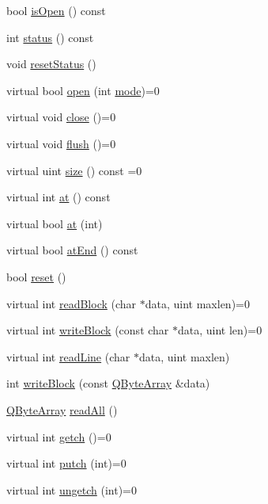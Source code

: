 \begin{DoxyCompactItemize}
\item 
bool \hyperlink{class_q_i_o_device_a3c7351cec1380d07f9e4b3ec96b2b1ff}{is\-Open} () const 
\item 
int \hyperlink{class_q_i_o_device_a8bcf950a774cbd3106d4c68d3b2f38c9}{status} () const 
\item 
void \hyperlink{class_q_i_o_device_ab1ada06d6d8928f3d31426739e477b19}{reset\-Status} ()
\item 
virtual bool \hyperlink{class_q_i_o_device_ab12465ab61dfc4e6de94a9b039d00759}{open} (int \hyperlink{class_q_i_o_device_a649d73845b061693fc34041ba743191c}{mode})=0
\item 
virtual void \hyperlink{class_q_i_o_device_a99e62b97d3c24562d2dd84c47fab6b06}{close} ()=0
\item 
virtual void \hyperlink{class_q_i_o_device_a4d70e7cca08ae728d486c63f4804e63b}{flush} ()=0
\item 
virtual uint \hyperlink{class_q_i_o_device_add26671f6640db9316df9922fef40b38}{size} () const =0
\item 
virtual int \hyperlink{class_q_i_o_device_a3bce8d0bb4d6fbaa012b9a61c3910907}{at} () const 
\item 
virtual bool \hyperlink{class_q_i_o_device_afbf6dc03efea5d2f5098b8316a8a66b9}{at} (int)
\item 
virtual bool \hyperlink{class_q_i_o_device_a11cbf4ba82ee565cb9eef28b972bf145}{at\-End} () const 
\item 
bool \hyperlink{class_q_i_o_device_a50910ef42a65d4c139af341f1ef2323f}{reset} ()
\item 
virtual int \hyperlink{class_q_i_o_device_ac0c97a10369456c0942192a14f11c188}{read\-Block} (char $\ast$data, uint maxlen)=0
\item 
virtual int \hyperlink{class_q_i_o_device_a90a5a6111eca9a444970cf49aea9f9a8}{write\-Block} (const char $\ast$data, uint len)=0
\item 
virtual int \hyperlink{class_q_i_o_device_aa360b2281966b05ff25504cf03046c90}{read\-Line} (char $\ast$data, uint maxlen)
\item 
int \hyperlink{class_q_i_o_device_ac2c00524f1222398355427621c705236}{write\-Block} (const \hyperlink{class_q_array}{Q\-Byte\-Array} \&data)
\item 
\hyperlink{class_q_array}{Q\-Byte\-Array} \hyperlink{class_q_i_o_device_a3b6261ecdae0766f83d351e39be9130d}{read\-All} ()
\item 
virtual int \hyperlink{class_q_i_o_device_a8fcd2eaee3ba67c6029f9e3e835bb7b1}{getch} ()=0
\item 
virtual int \hyperlink{class_q_i_o_device_a97247e4849c3038bde0e115215f5b995}{putch} (int)=0
\item 
virtual int \hyperlink{class_q_i_o_device_a8a5c37807d314cc04d65f1d0825c6e31}{ungetch} (int)=0
\end{DoxyCompactItemize}
